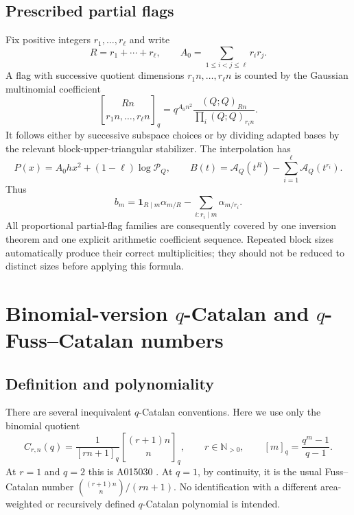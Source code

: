 \documentclass[11pt]{article}
\numberwithin{equation}{section}
\theoremstyle{definition}
\newcommand{\N}{\mathbb N}
\newcommand{\qbin}[2]{\genfrac{[}{]}{0pt}{}{#1}{#2}_{q}}
\newcommand{\pp}[1]{(Q;Q)_{#1}}
\newcommand{\Pinf}{\mathcal P_Q}
\newcommand{\A}{\mathcal A_Q}
\newcommand{\one}{\mathbf 1}
\begin{document}
\subsection{Prescribed partial flags}

Fix positive integers $r_1,\ldots,r_\ell$ and write
\[
 R=r_1+\cdots+r_\ell,\qquad
 A_0=\sum_{1\le i<j\le\ell}r_i r_j.
\]
A flag with successive quotient dimensions $r_1n,\ldots,r_\ell n$ is counted by the Gaussian multinomial coefficient
\begin{equation}\label{eq:multinomial}
 \genfrac{[}{]}{0pt}{}{Rn}{r_1n,\ldots,r_\ell n}_q
 =q^{A_0n^2}\frac{\pp{Rn}}{\prod_i\pp{r_i n}}.
\end{equation}
It follows either by successive subspace choices or by dividing adapted bases by the relevant block-upper-triangular stabilizer. The interpolation has
\begin{equation}\label{eq:partialflag-phase}
 P(x)=A_0hx^2+(1-\ell)\log\Pinf,
 \qquad
 B(t)=\A(t^R)-\sum_{i=1}^{\ell}\A(t^{r_i}).
\end{equation}
Thus
\begin{equation}\label{eq:partialflag-b}
 b_m=\one_{R\mid m}\alpha_{m/R}
     -\sum_{i:r_i\mid m}\alpha_{m/r_i}.
\end{equation}
All proportional partial-flag families are consequently covered by one inversion theorem and one explicit arithmetic coefficient sequence. Repeated block sizes automatically produce their correct multiplicities; they should not be reduced to distinct sizes before applying this formula.

\section{Binomial-version \texorpdfstring{$q$}{q}-Catalan and \texorpdfstring{$q$}{q}-Fuss--Catalan numbers}
\label{sec:catalan}

\subsection{Definition and polynomiality}

There are several inequivalent $q$-Catalan conventions. Here we use only the binomial quotient
\begin{equation}\label{eq:qfuss-definition}
 C_{r,n}(q)=\frac1{[rn+1]_q}\qbin{(r+1)n}{n},
 \qquad r\in\N_{>0},\qquad
 [m]_q=\frac{q^m-1}{q-1}.
\end{equation}
At $r=1$ and $q=2$ this is A015030 \cite{oeiscatalan}. At $q=1$, by continuity, it is the usual Fuss--Catalan number
$\binom{(r+1)n}{n}/(rn+1)$. No identification with a different area-weighted or recursively defined $q$-Catalan polynomial is intended.
\end{document}
